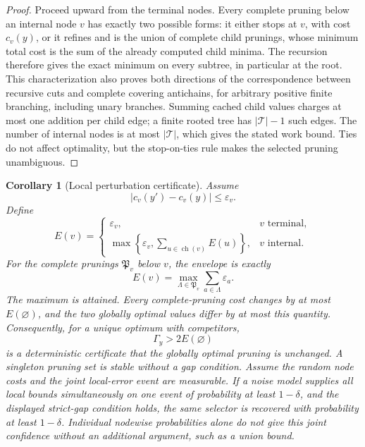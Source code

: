 \documentclass[11pt]{article}
\newtheorem{corollary}[theorem]{Corollary}
\theoremstyle{definition}
\theoremstyle{remark}
\begin{document}
\begin{proof}
Proceed upward from the terminal nodes.  Every complete pruning below an internal node $v$ has exactly two possible forms: it either stops at $v$, with cost $c_v(y)$, or it refines and is the union of complete child prunings, whose minimum total cost is the sum of the already computed child minima.  The recursion therefore gives the exact minimum on every subtree, in particular at the root. This characterization also proves both directions of the correspondence between recursive cuts and complete covering antichains, for arbitrary positive finite branching, including unary branches. Summing cached child values charges at most one addition per child edge; a finite rooted tree has $|\mathcal T|-1$ such edges. The number of internal nodes is at most $|\mathcal T|$, which gives the stated work bound. Ties do not affect optimality, but the stop-on-ties rule makes the selected pruning unambiguous.
\end{proof}

\begin{corollary}[Local perturbation certificate]\label{result:16}
Assume
\[
|c_v(y')-c_v(y)|\le\varepsilon_v.
\]
Define
\[
E(v)
=
\begin{cases}
\varepsilon_v,&v\text{ terminal},\\[1mm]
\displaystyle
\max\left\{\varepsilon_v,
\sum_{u\in\operatorname{ch}(v)}E(u)\right\},&v\text{ internal}.
\end{cases}
\]
For the complete prunings $\mathfrak P_v$ below $v$, the envelope is exactly
\[
E(v)=\max_{\Lambda\in\mathfrak P_v}\sum_{a\in\Lambda}\varepsilon_a.
\]
The maximum is attained. Every complete-pruning cost changes by at most $E(\varnothing)$, and the two globally optimal values differ by at most this quantity. Consequently, for a unique optimum with competitors,
\[
\boxed{\Gamma_y>2E(\varnothing)}
\]
is a deterministic certificate that the globally optimal pruning is unchanged.  A singleton pruning set is stable without a gap condition. Assume the random node costs and the joint local-error event are measurable. If a noise model supplies \emph{all} local bounds simultaneously on one event of probability at least $1-\delta$, and the displayed strict-gap condition holds, the same selector is recovered with probability at least $1-\delta$. Individual nodewise probabilities alone do not give this joint confidence without an additional argument, such as a union bound.
\end{corollary}
\end{document}
